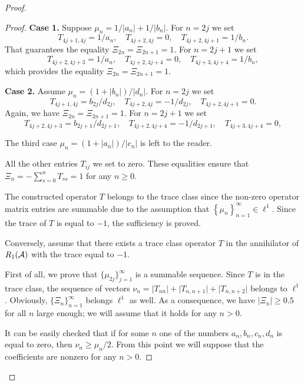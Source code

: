 \begin{proof}
\begin{proof}
        \noindent\textbf{Case 1.}
        Suppose $\mu_n = 1/\lvert a_n\rvert + 1/\lvert b_n \rvert$.
        For $n=2j$ we set
        \[
          T_{4j+1,4j}=1/a_n, \quad T_{4j+2,4j} = 0, \quad T_{4j+2,4j+1}=1/b_n.
        \]
        That guarantees the equality $\Xi_{2n} = \Xi_{2n+1} = 1$.
        For $n=2j+1$ we set
        \[
          T_{4j+2,4j+3}=1/a_n, \quad T_{4j+2,4j+4} = 0, \quad T_{4j+3,4j+4}=1/b_n,
        \]
        which provides the equality $\Xi_{2n} = \Xi_{2n+1} = 1$.

        \medskip
        \noindent\textbf{Case 2.}
        Assume $\mu_n = (1 + \lvert b_n\rvert)/\lvert d_n\rvert$.
        For $n=2j$ we set
        \[
          T_{4j+1,4j} = b_{2j}/d_{2j}, \quad T_{4j+2,4j} = -1/d_{2j}, \quad T_{4j+2,4j+1} = 0.
        \]
        Again, we have $\Xi_{2n} = \Xi_{2n+1} = 1$.
        For $n = 2j + 1$ we set
        \[
          T_{4j+2,4j+3}=b_{2j+1}/d_{2j+1},  \quad T_{4j+2,4j+4} = -1/d_{2j+1}, \quad T_{4j+3,4j+4}=0,
        \]

        The third case $\mu_n = (1 + \lvert a_n\rvert)/\lvert c_n\rvert$ is left to the reader.
        \medskip

        All the other entries $T_{ij}$ we set to zero.
        These equalities ensure that $\Xi_n = -\sum_{s=0}^n T_{ss} = 1$ for any $n \geq 0$.

        The constructed operator $T$ belongs to the trace class since the non-zero operator matrix entries are summable
          due to the assumption that $\left\{\mu_n\right\}_{n=1}^\infty \in \ell^1$.
        Since the trace of $T$ is equal to $-1$, the sufficiency is proved.

        \medskip
        Conversely, assume that there exists a trace class operator $T$ in the annihilator of $R_1(\cal{A})$ with the trace equal to $-1$.

        First of all, we prove that $\{\mu_{2j}\}_{j=1}^\infty$ is a summable sequence.
        Since $T$ is in the trace class, the sequence of vectors $\nu_n = \lvert T_{nn} \rvert + \lvert T_{n, n + 1} \rvert + \lvert T_{n, n+2} \rvert$
          belongs to $\ell^1$.
        Obviously, $\{\Xi_n\}_{n=1}^\infty$ belongs $\ell^1$ as well.
        As a consequence, we have $\lvert \Xi_n\rvert \geq 0.5$ for all $n$ large enough; we will assume that it holds for any $n > 0$.

        It can be easily checked that if for some $n$ one of the numbers $a_n,b_n,c_n,d_n$ is equal to zero, then $\nu_n \geq \mu_n/2$.
        From this point we will suppose that the coefficients are nonzero for any $n > 0$.


\end{proof}
\end{proof}
